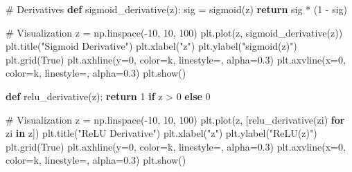 \documentclass[
  letterpaper,
  DIV=11,
  numbers=noendperiod]{scrreprt}
\newenvironment{Shaded}{\begin{snugshade}}{\end{snugshade}}
\newcommand{\CommentTok}[1]{\textcolor[rgb]{0.37,0.37,0.37}{#1}}
\newcommand{\ControlFlowTok}[1]{\textcolor[rgb]{0.00,0.23,0.31}{\textbf{#1}}}
\newcommand{\DecValTok}[1]{\textcolor[rgb]{0.68,0.00,0.00}{#1}}
\newcommand{\FloatTok}[1]{\textcolor[rgb]{0.68,0.00,0.00}{#1}}
\newcommand{\KeywordTok}[1]{\textcolor[rgb]{0.00,0.23,0.31}{\textbf{#1}}}
\newcommand{\NormalTok}[1]{\textcolor[rgb]{0.00,0.23,0.31}{#1}}
\newcommand{\OperatorTok}[1]{\textcolor[rgb]{0.37,0.37,0.37}{#1}}
\newcommand{\StringTok}[1]{\textcolor[rgb]{0.13,0.47,0.30}{#1}}
\newcommand{\VariableTok}[1]{\textcolor[rgb]{0.07,0.07,0.07}{#1}}
\begin{document}
\begin{Shaded}
\begin{Highlighting}[]
\CommentTok{\# Derivatives}
\KeywordTok{def}\NormalTok{ sigmoid\_derivative(z):}
\NormalTok{    sig }\OperatorTok{=}\NormalTok{ sigmoid(z)}
    \ControlFlowTok{return}\NormalTok{ sig }\OperatorTok{*}\NormalTok{ (}\DecValTok{1} \OperatorTok{{-}}\NormalTok{ sig)}

\CommentTok{\# Visualization}
\NormalTok{z }\OperatorTok{=}\NormalTok{ np.linspace(}\OperatorTok{{-}}\DecValTok{10}\NormalTok{, }\DecValTok{10}\NormalTok{, }\DecValTok{100}\NormalTok{)}
\NormalTok{plt.plot(z, sigmoid\_derivative(z))}
\NormalTok{plt.title(}\StringTok{"Sigmoid Derivative"}\NormalTok{)}
\NormalTok{plt.xlabel(}\StringTok{"z"}\NormalTok{)}
\NormalTok{plt.ylabel(}\StringTok{"sigmoid\textquotesingle{}(z)"}\NormalTok{)}
\NormalTok{plt.grid(}\VariableTok{True}\NormalTok{)}
\NormalTok{plt.axhline(y}\OperatorTok{=}\DecValTok{0}\NormalTok{, color}\OperatorTok{=}\StringTok{\textquotesingle{}k\textquotesingle{}}\NormalTok{, linestyle}\OperatorTok{=}\StringTok{\textquotesingle{}{-}\textquotesingle{}}\NormalTok{, alpha}\OperatorTok{=}\FloatTok{0.3}\NormalTok{)}
\NormalTok{plt.axvline(x}\OperatorTok{=}\DecValTok{0}\NormalTok{, color}\OperatorTok{=}\StringTok{\textquotesingle{}k\textquotesingle{}}\NormalTok{, linestyle}\OperatorTok{=}\StringTok{\textquotesingle{}{-}\textquotesingle{}}\NormalTok{, alpha}\OperatorTok{=}\FloatTok{0.3}\NormalTok{)}
\NormalTok{plt.show()}
    
\KeywordTok{def}\NormalTok{ relu\_derivative(z):}
    \ControlFlowTok{return} \DecValTok{1} \ControlFlowTok{if}\NormalTok{ z }\OperatorTok{\textgreater{}} \DecValTok{0} \ControlFlowTok{else} \DecValTok{0}

\CommentTok{\# Visualization}
\NormalTok{z }\OperatorTok{=}\NormalTok{ np.linspace(}\OperatorTok{{-}}\DecValTok{10}\NormalTok{, }\DecValTok{10}\NormalTok{, }\DecValTok{100}\NormalTok{)}
\NormalTok{plt.plot(z, [relu\_derivative(zi) }\ControlFlowTok{for}\NormalTok{ zi }\KeywordTok{in}\NormalTok{ z])}
\NormalTok{plt.title(}\StringTok{"ReLU Derivative"}\NormalTok{)}
\NormalTok{plt.xlabel(}\StringTok{"z"}\NormalTok{)}
\NormalTok{plt.ylabel(}\StringTok{"ReLU\textquotesingle{}(z)"}\NormalTok{)}
\NormalTok{plt.grid(}\VariableTok{True}\NormalTok{)}
\NormalTok{plt.axhline(y}\OperatorTok{=}\DecValTok{0}\NormalTok{, color}\OperatorTok{=}\StringTok{\textquotesingle{}k\textquotesingle{}}\NormalTok{, linestyle}\OperatorTok{=}\StringTok{\textquotesingle{}{-}\textquotesingle{}}\NormalTok{, alpha}\OperatorTok{=}\FloatTok{0.3}\NormalTok{)}
\NormalTok{plt.axvline(x}\OperatorTok{=}\DecValTok{0}\NormalTok{, color}\OperatorTok{=}\StringTok{\textquotesingle{}k\textquotesingle{}}\NormalTok{, linestyle}\OperatorTok{=}\StringTok{\textquotesingle{}{-}\textquotesingle{}}\NormalTok{, alpha}\OperatorTok{=}\FloatTok{0.3}\NormalTok{)}
\NormalTok{plt.show()}
\end{Highlighting}
\end{Shaded}
\end{document}
